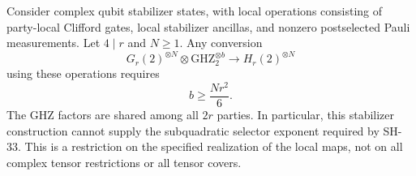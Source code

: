 \begin{proposition}
\label{rt:stabilizer-selector}
Consider complex qubit stabilizer states, with local operations
consisting of party-local Clifford gates, local stabilizer
ancillas, and nonzero postselected Pauli measurements.
Let $4\mid r$ and $N\ge1$. Any conversion
\[
 G_r(2)^{\otimes N}\otimes\mathrm{GHZ}_{2}^{\otimes b}
 \longrightarrow H_r(2)^{\otimes N}
\]
using these operations requires
\[
                         b\ge \frac{Nr^2}{6}.
 \tag{RT-STAB-selector}
\]
The GHZ factors are shared among all $2r$ parties.
In particular, this stabilizer construction cannot supply the
subquadratic selector exponent required by SH-33.
This is a restriction on the specified realization of the local
maps, not on all complex tensor restrictions or all tensor covers.
\end{proposition}
